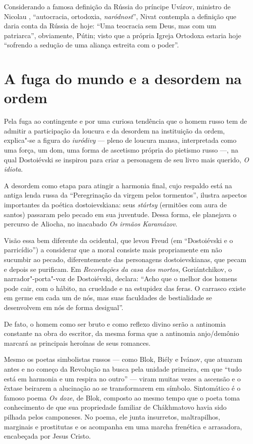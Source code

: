 Considerando a famosa definição da Rússia do príncipe Uvárov, ministro de Nicolau , ``autocracia, ortodoxia, \emph{naródnost}'', Nivat contempla a definição que daria conta da Rússia de hoje: ``Uma teocracia sem Deus, mas com um patriarca'', obviamente, Pútin; visto que a própria Igreja Ortodoxa estaria hoje ``sofrendo a sedução de uma aliança estreita com o poder''.

\section{A fuga do mundo e a desordem na ordem}

Pela fuga ao contingente e por uma curiosa tendência que o homem russo
tem de admitir a participação da loucura e da desordem na instituição da
ordem, explica"-se a figura do \emph{iuródivy} --- pleno de loucura mansa,
interpretada como uma força, um dom, uma forma de ascetismo própria do
pietismo russo ---, na qual Dostoiévski se inspirou para criar a
personagem de seu livro mais querido, \emph{O idiota}.

A desordem como etapa para atingir a harmonia final, cujo respaldo está na antiga lenda russa da ``Peregrinação da virgem pelos tormentos'', ilustra aspectos importantes da poética dostoievskiana: seus \emph{stártsy} (ermitões com aura de santos) passaram pelo pecado em sua juventude. Dessa forma, ele planejava o percurso de Aliocha, no inacabado \emph{Os irmãos Karamázov}.

Visão essa bem diferente da ocidental, que levou Freud
(em ``Dostoiévski e o parricídio'') a considerar que a moral consiste
mais propriamente em não sucumbir ao pecado, diferentemente das
personagens dostoievskianas, que pecam e depois se purificam.
Em \emph{Recordações da casa dos mortos}, Goriántchikov, o
narrador"-porta"-voz de Dostoiévski, declara: ``Acho que o melhor dos
homens pode cair, com o hábito, na crueldade e na estupidez das feras. O carrasco existe em germe em cada um de nós, mas suas faculdades de bestialidade se desenvolvem em nós de forma desigual''.

De fato, o homem como ser bruto e como reflexo divino serão a antinomia constante na obra do escritor, da mesma forma que a antinomia anjo/demônio marcará as principais heroínas de seus romances.

Mesmo os poetas simbolistas russos --- como Blok, Biély e Ivánov, que atuaram antes e no começo da Revolução na busca pela unidade primeira, em que ``tudo está em harmonia e um respira no outro'' --- viram muitas vezes a ascensão e o êxtase beirarem a alucinação ao se transformarem em símbolo. Sintomático é o famoso poema \emph{Os doze}, de Blok, composto ao mesmo tempo que o poeta toma conhecimento de que sua propriedade familiar de Chákhmatovo havia sido pilhada pelos camponeses. No poema,
ele junta insurretos, maltrapilhos, marginais e prostitutas e os acompanha em uma marcha frenética e arrasadora, encabeçada por Jesus Cristo.

